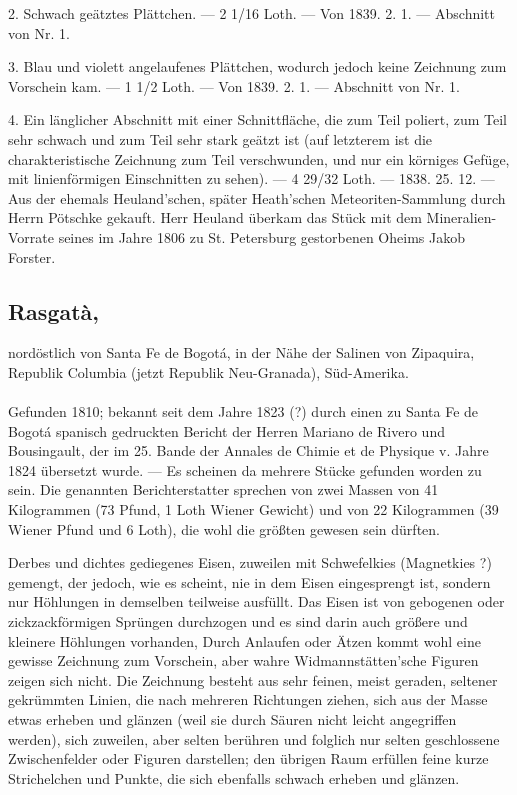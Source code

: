 \documentclass[a4paper, 11pt, oneside, polutonikogreek, german]{article}
\begin{document}
2. Schwach geätztes Plättchen. — 2 1/16 Loth. — Von 1839. 2. 1. — Abschnitt von Nr. 1.

3. Blau und violett angelaufenes Plättchen, wodurch jedoch keine Zeichnung zum Vorschein kam. — 1 1/2 Loth. — Von 1839. 2. 1. — Abschnitt von Nr. 1.

4. Ein länglicher Abschnitt mit einer Schnittfläche, die zum Teil poliert, zum Teil sehr schwach und zum Teil sehr stark geätzt ist (auf letzterem ist die charakteristische Zeichnung zum Teil verschwunden, und nur ein körniges Gefüge, mit linienförmigen Einschnitten zu sehen). — 4 29/32 Loth. — 1838. 25. 12. — Aus der ehemals Heuland'schen, später Heath'schen Meteoriten-Sammlung durch Herrn Pötschke gekauft. Herr Heuland überkam das Stück mit dem Mineralien-Vorrate seines im Jahre 1806 zu St. Petersburg gestorbenen Oheims Jakob Forster.
\subsection[Rasgatà.]{Rasgatà,}
\begin{center}
\small
nordöstlich von Santa Fe de Bogotá, in der Nähe der Salinen von Zipaquira, Republik Columbia (jetzt Republik Neu-Granada), Süd-Amerika.
\end{center}
\paragraph{}
Gefunden 1810; bekannt seit dem Jahre 1823 (?) durch einen zu Santa Fe de Bogotá spanisch gedruckten Bericht der Herren Mariano de Rivero und Bousingault, der im 25. Bande der Annales de Chimie et de Physique v. Jahre 1824 übersetzt wurde. — Es scheinen da mehrere Stücke gefunden worden zu sein. Die genannten Berichterstatter sprechen von zwei Massen von 41 Kilogrammen (73 Pfund, 1 Loth Wiener Gewicht) und von 22 Kilogrammen (39 Wiener Pfund und 6 Loth), die wohl die größten gewesen sein dürften.

Derbes und dichtes gediegenes Eisen, zuweilen mit Schwefelkies (Magnetkies ?) gemengt, der jedoch, wie es scheint, nie in dem Eisen eingesprengt ist, sondern nur Höhlungen in demselben teilweise ausfüllt. Das Eisen ist von gebogenen oder zickzackförmigen Sprüngen durchzogen und es sind darin auch größere und kleinere Höhlungen vorhanden, Durch Anlaufen oder Ätzen kommt wohl eine gewisse Zeichnung zum Vorschein, aber wahre Widmannstätten'sche Figuren zeigen sich nicht. Die Zeichnung besteht aus sehr feinen, meist geraden, seltener gekrümmten Linien, die nach mehreren Richtungen ziehen, sich aus der Masse etwas erheben und glänzen (weil sie durch Säuren nicht leicht angegriffen werden), sich zuweilen, aber selten berühren und folglich nur selten geschlossene Zwischenfelder oder Figuren darstellen; den übrigen Raum erfüllen feine kurze Strichelchen und Punkte, die sich ebenfalls schwach erheben und glänzen.
\end{document}
